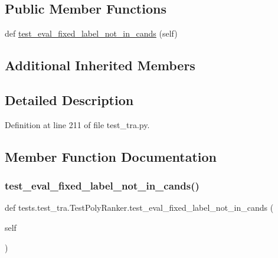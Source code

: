 \subsection*{Public Member Functions}
\begin{DoxyCompactItemize}
\item 
def \hyperlink{classtests_1_1test__tra_1_1TestPolyRanker_ae89dfeba6d9dab6d40cfed102ff26294}{test\+\_\+eval\+\_\+fixed\+\_\+label\+\_\+not\+\_\+in\+\_\+cands} (self)
\end{DoxyCompactItemize}
\subsection*{Additional Inherited Members}


\subsection{Detailed Description}


Definition at line 211 of file test\+\_\+tra.\+py.



\subsection{Member Function Documentation}
\mbox{\label{classtests_1_1test__tra_1_1TestPolyRanker_ae89dfeba6d9dab6d40cfed102ff26294}} 
\subsubsection{\texorpdfstring{test\+\_\+eval\+\_\+fixed\+\_\+label\+\_\+not\+\_\+in\+\_\+cands()}{test\_eval\_fixed\_label\_not\_in\_cands()}}
{\footnotesize\ttfamily def tests.\+test\+\_\+tra.\+Test\+Poly\+Ranker.\+test\+\_\+eval\+\_\+fixed\+\_\+label\+\_\+not\+\_\+in\+\_\+cands (\begin{DoxyParamCaption}\item[{}]{self }\end{DoxyParamCaption})}



